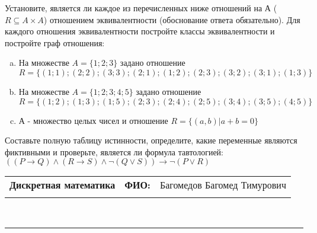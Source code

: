 \documentclass[10pt]{exam}
\newcommand{\class}{Дискретная математика}
\newcommand{\examdate}{}
\begin{document}
\begin{questions}
\question
Установите, является ли каждое из перечисленных ниже отношений на А ($R \subseteq A \times A$) отношением эквивалентности (обоснование ответа обязательно). Для каждого отношения эквивалентности постройте классы 
эквивалентности и постройте граф отношения:
\begin{enumerate} [a)]\setcounter{enumi}{0}
\item На множестве $A = \{1; 2; 3\}$ задано отношение $R = \{(1; 1); (2; 2); (3; 3); (2; 1); (1; 2); (2; 3); (3; 2); (3; 1); (1; 3)\}$
\item На множестве $A = \{1; 2; 3; 4; 5\}$ задано отношение $R = \{(1; 2); (1; 3); (1; 5); (2; 3); (2; 4); (2; 5); (3; 4); (3; 5); (4; 5)\}$
\item А - множество целых чисел и отношение $R = \{(a,b)|a + b = 0\}$
\end{enumerate}\question Составьте полную таблицу истинности, определите, какие переменные являются фиктивными и проверьте, является ли формула тавтологией:
$((P \rightarrow Q) \land (R \rightarrow S) \land \neg (Q \lor S)) \rightarrow \neg (P \lor R)$

\end{questions}
\newpage
\begin{flushright}
\begin{tabular}{p{2.8in} r l}
\textbf{\class} & \textbf{ФИО:} &Багомедов Багомед Тимурович
\\

\textbf{\examdate} &&\\
\end{tabular}\\
\end{flushright}
\rule[1ex]{\textwidth}{.1pt}
\end{document}

